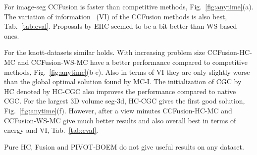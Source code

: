 \documentclass[10pt,twocolumn,letterpaper]{article}
\theoremstyle{definition}
\begin{document}
For image-seg CCFusion is faster than competitive methods, \cf Fig.~\ref{fig:anytime}(a).
The variation of information~\cite{} (VI) of the CCFusion methods is also best, \cf Tab.~\ref{tab:eval}.
Proposals by EHC seemed to be a bit better than WS-based ones.

For the knott-datasets similar holds. With increasing problem size CCFusion-HC-MC and CCFusion-WS-MC have a better performance compared to competitive methods, \cf Fig.~\ref{fig:anytime}(b-e).
Also in terms of VI they are only slightly worse than the global optimal solution found by MC-I.
The initialization of CGC by HC denoted by HC-CGC also improves the performance compared to native CGC.
For the largest 3D volume seg-3d, HC-CGC gives the first good solution, \cf  Fig.~\ref{fig:anytime}(f).
However, after a view minutes  CCFusion-HC-MC and CCFusion-WS-MC give much better results and also overall best in terms of energy and VI, \cf Tab.~\ref{tab:eval}.

Pure HC, Fusion and PIVOT-BOEM do not give useful results on any dataset.
\end{document}
